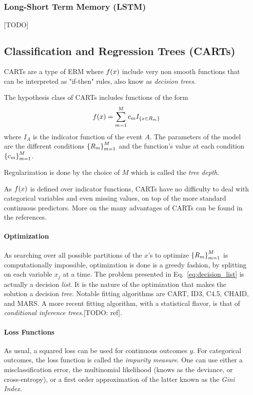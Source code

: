 \subsubsection{Long-Short Term Memory (LSTM)}
[TODO]



\subsection{Classification and Regression Trees (CARTs)}
CARTs are a type of ERM where $f(x)$ include very non smooth functions that can be interpreted as "if-then" rules, also know as \emph{decision trees}.

The hypothesis class of CARTs includes functions of the form
\begin{align}
\label{eq:decision_list}
	f(x)=\sum_{m=1}^M c_m I_{\left\{ x \in R_m \right\}}
\end{align}
where $I_A$ is the indicator function of the event $A$.
The parameters of the model are the different conditions $\left\{ R_m \right\}_{m=1}^M$ and the function's value at each condition $\left\{ c_m \right\}_{m=1}^M$. 

Regularization is done by the choice of $M$ which is called the \emph{tree depth}.

As $f(x)$ is defined over indicator functions, CARTs have no difficulty to deal with categorical variables and even missing values, on top of the more standard continuous predictors. More on the many advantages of CARTs can be found in the references.

\paragraph{Optimization}
As searching over all possible partitions of the $x$'s to optimize $\left\{ R_m \right\}_{m=1}^M$ is computationally impossible, optimization is done is a greedy fashion, by splitting on each variable $x_j$ at a time.
The problem presented in Eq.~\ref{eq:decision_list} is actually a decision \emph{list}. It is the nature of the optimization that makes the solution a decision \emph{tree}.
Notable fitting algorithms are CART, ID3, C4.5, CHAID, and MARS.
A more recent fitting algorithm, with a statistical flavor, is that of \emph{conditional inference trees}.[TODO: ref]. 


\paragraph{Loss Functions}
As usual, a squared loss can be used for continuous outcomes $y$.
For categorical outcomes, the loss function is called the \emph{impurity measure}.
One can use either a misclassification error, the multinomial likelihood (knows as the deviance, or cross-entropy), or a first order approximation of the latter known as the \emph{Gini Index}.


